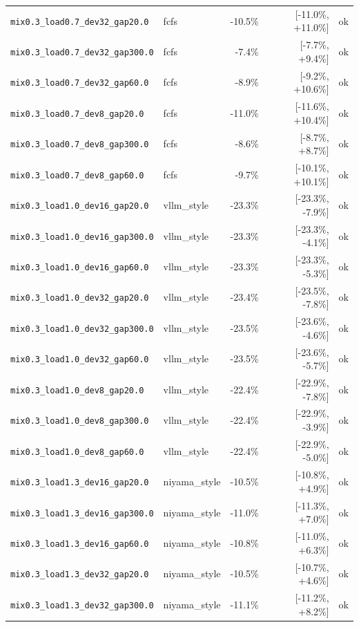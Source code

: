 \begin{longtable}{llrrl}
\texttt{mix0.3\_load0.7\_dev32\_gap20.0} & fcfs & -10.5\% & [-11.0\%, +11.0\%] & ok \\
\texttt{mix0.3\_load0.7\_dev32\_gap300.0} & fcfs & -7.4\% & [-7.7\%, +9.4\%] & ok \\
\texttt{mix0.3\_load0.7\_dev32\_gap60.0} & fcfs & -8.9\% & [-9.2\%, +10.6\%] & ok \\
\texttt{mix0.3\_load0.7\_dev8\_gap20.0} & fcfs & -11.0\% & [-11.6\%, +10.4\%] & ok \\
\texttt{mix0.3\_load0.7\_dev8\_gap300.0} & fcfs & -8.6\% & [-8.7\%, +8.7\%] & ok \\
\texttt{mix0.3\_load0.7\_dev8\_gap60.0} & fcfs & -9.7\% & [-10.1\%, +10.1\%] & ok \\
\texttt{mix0.3\_load1.0\_dev16\_gap20.0} & vllm\_style & -23.3\% & [-23.3\%, -7.9\%] & ok \\
\texttt{mix0.3\_load1.0\_dev16\_gap300.0} & vllm\_style & -23.3\% & [-23.3\%, -4.1\%] & ok \\
\texttt{mix0.3\_load1.0\_dev16\_gap60.0} & vllm\_style & -23.3\% & [-23.3\%, -5.3\%] & ok \\
\texttt{mix0.3\_load1.0\_dev32\_gap20.0} & vllm\_style & -23.4\% & [-23.5\%, -7.8\%] & ok \\
\texttt{mix0.3\_load1.0\_dev32\_gap300.0} & vllm\_style & -23.5\% & [-23.6\%, -4.6\%] & ok \\
\texttt{mix0.3\_load1.0\_dev32\_gap60.0} & vllm\_style & -23.5\% & [-23.6\%, -5.7\%] & ok \\
\texttt{mix0.3\_load1.0\_dev8\_gap20.0} & vllm\_style & -22.4\% & [-22.9\%, -7.8\%] & ok \\
\texttt{mix0.3\_load1.0\_dev8\_gap300.0} & vllm\_style & -22.4\% & [-22.9\%, -3.9\%] & ok \\
\texttt{mix0.3\_load1.0\_dev8\_gap60.0} & vllm\_style & -22.4\% & [-22.9\%, -5.0\%] & ok \\
\texttt{mix0.3\_load1.3\_dev16\_gap20.0} & niyama\_style & -10.5\% & [-10.8\%, +4.9\%] & ok \\
\texttt{mix0.3\_load1.3\_dev16\_gap300.0} & niyama\_style & -11.0\% & [-11.3\%, +7.0\%] & ok \\
\texttt{mix0.3\_load1.3\_dev16\_gap60.0} & niyama\_style & -10.8\% & [-11.0\%, +6.3\%] & ok \\
\texttt{mix0.3\_load1.3\_dev32\_gap20.0} & niyama\_style & -10.5\% & [-10.7\%, +4.6\%] & ok \\
\texttt{mix0.3\_load1.3\_dev32\_gap300.0} & niyama\_style & -11.1\% & [-11.2\%, +8.2\%] & ok \\

\end{longtable}
